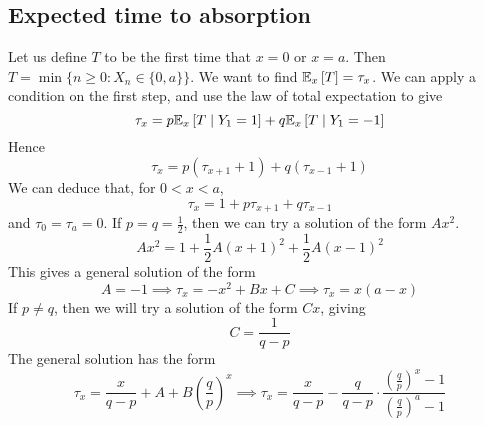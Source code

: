 \subsection{Expected time to absorption}
Let us define \(T\) to be the first time that \(x = 0\) or \(x = a\).
Then \(T = \min \{ n \geq 0 \colon X_n \in \{ 0, a \} \}\).
We want to find \(\mathbb{E}_{x}\left[{T}\right] = \tau_x\).
We can apply a condition on the first step, and use the law of total expectation to give
\[
	\tau_x = p \mathbb{E}_{x}\left[{T \mid Y_1 = 1}\right] + q \mathbb{E}_{x}\left[{T \mid Y_1 = -1}\right]
\]
Hence
\[
	\tau_x = p (\tau_{x + 1} + 1) + q (\tau_{x - 1} + 1)
\]
We can deduce that, for \(0 < x < a\),
\[
	\tau_x = 1 + p \tau_{x+1} + q \tau_{x-1}
\]
and \(\tau_0 = \tau_a = 0\).
If \(p = q = \frac{1}{2}\), then we can try a solution of the form \(Ax^2\).
\[
	Ax^2 = 1 + \frac{1}{2}A(x+1)^2 + \frac{1}{2}A(x-1)^2
\]
This gives a general solution of the form
\[
	A = -1 \implies \tau_x = -x^2 + Bx + C \implies \tau_x = x(a-x)
\]
If \(p \neq q\), then we will try a solution of the form \(Cx\), giving
\[
	C = \frac{1}{q-p}
\]
The general solution has the form
\[
	\tau_x = \frac{x}{q-p} + A + B\left( \frac{q}{p} \right)^x \implies \tau_x = \frac{x}{q-p} - \frac{q}{q-p} \cdot \frac{\left( \frac{q}{p} \right)^x - 1}{\left( \frac{q}{p} \right)^a - 1}
\]
